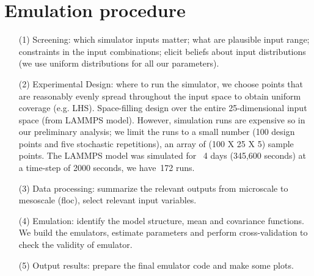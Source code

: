 \documentclass[12pt,titlepage]{report}
\theoremstyle{definition}
\theoremstyle{remark}
\begin{document}
\section{Emulation procedure}
\begin{itemize}
\item[(1)] Screening: which simulator inputs matter; what are
plausible input range; constraints in the input combinations; 
elicit beliefs about input distributions (we use uniform distributions for all our parameters). 

\item[(2)] Experimental Design: where to run the simulator, we choose points that are reasonably evenly spread throughout the input space to obtain uniform coverage (e.g. LHS). Space-filling design over the entire 25-dimensional input space (from LAMMPS model).  
However, simulation runs are expensive so in our preliminary analysis; we limit the runs to a small number (100 design points and five stochastic repetitions), an array of (100 X 25 X 5) sample points. The LAMMPS model was simulated for ~4 days (345,600 seconds) at a time-step of 2000 seconds, we have~172 runs.

\item[(3)] Data processing: summarize the relevant outputs from microscale to mesoscale (floc), select relevant input variables.

\item[(4)] Emulation: identify the model structure, mean and covariance functions. We build the emulators, estimate parameters and perform cross-validation to check the validity of emulator. 

\item[(5)] Output results: prepare the final emulator code and make some plots.
\end{itemize} 
\end{document}
